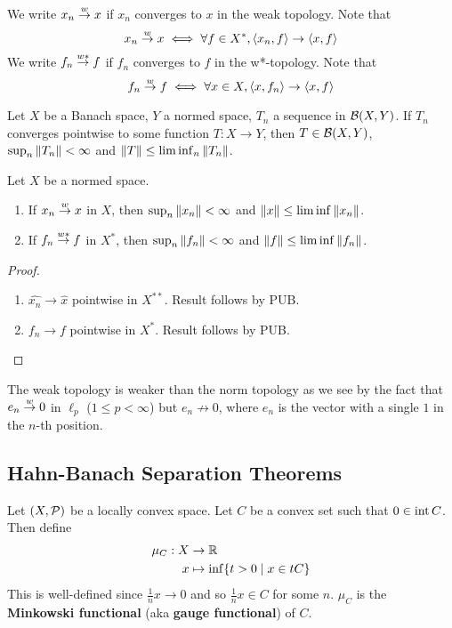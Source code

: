 \documentclass{article}
\begin{document}
\begin{notation}
  We write $x_n \overset w\to x$ if $x_n$ converges to $x$ in the weak topology. Note that
  $$x_n \overset w\to x \iff \forall f \in X^*, \left\langle x_n, f\right\rangle \to \left\langle x, f\right\rangle$$
  We write $f_n \overset{w*}\to f$ if $f_n$ converges to $f$ in the w*-topology. Note that
  $$f_n \overset w\to f \iff \forall x \in X, \left\langle x, f_n\right\rangle \to \left\langle x, f\right\rangle$$
\end{notation}

\begin{thm}
  Let $X$ be a Banach space, $Y$ a normed space, $T_n$ a sequence in $\mathcal B(X, Y)$. If $T_n$ converges pointwise to some function $T : X \to Y$, then $T \in \mathcal B(X, Y)$, $\sup_n \left\lVert T_n\right\rVert < \infty$ and $\left\lVert T\right\rVert \le \liminf_n \left\lVert T_n\right\rVert$.
\end{thm}

\begin{prop}
  Let $X$ be a normed space.
  \begin{enumerate}
    \item If $x_n \overset w\to x$ in $X$, then $\sup_n \left\lVert x_n\right\rVert < \infty$ and $\left\lVert x\right\rVert \le \liminf \left\lVert x_n\right\rVert$.
    \item If $f_n \overset{w*}\to f$ in $X^*$, then $\sup_n \left\lVert f_n\right\rVert < \infty$ and $\left\lVert f\right\rVert \le \liminf \left\lVert f_n\right\rVert$.
  \end{enumerate}
\end{prop}
\begin{proof}~
  \begin{enumerate}
    \item $\widehat{x_n} \to \hat x$ pointwise in $X^{**}$. Result follows by PUB.
    \item $f_n \to f$ pointwise in $X^*$. Result follows by PUB.
  \end{enumerate}
\end{proof}

\newlec

The weak topology is weaker than the norm topology as we see by the fact that $e_n \overset w\to 0$ in $\ell_p$ ($1 \le p < \infty$) but $e_n \not\to 0$, where $e_n$ is the vector with a single $1$ in the $n$-th position.

\subsection{Hahn-Banach Separation Theorems}

Let $(X, \mathcal P)$ be a locally convex space. Let $C$ be a convex set such that $0 \in \operatorname{int} C$. Then define
\begin{align*}
  \mu_C : X & \to \mathbb R \\
  x & \mapsto \inf \{t > 0 \mid x \in tC\}
\end{align*}
This is well-defined since $\frac 1n x \to 0$ and so $\frac 1n x \in C$ for some $n$. $\mu_C$ is the {\bf Minkowski functional} (aka {\bf gauge functional}) of $C$.
\end{document}
